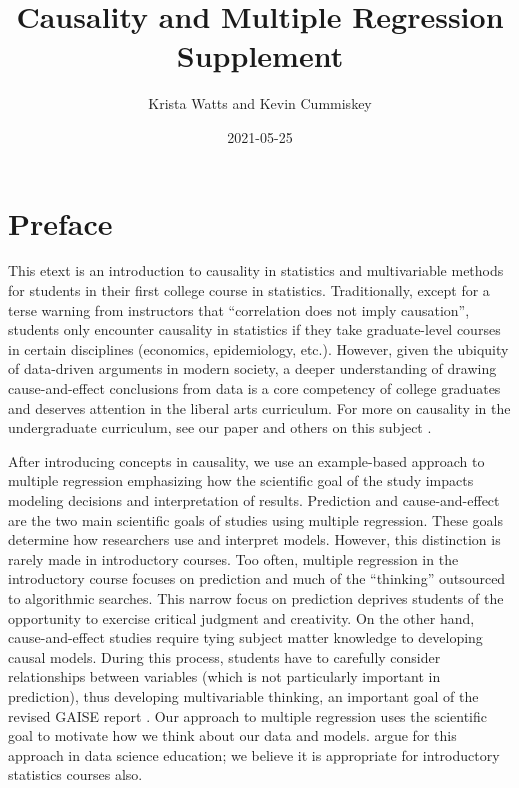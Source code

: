 \documentclass[]{book}
\title{Causality and Multiple Regression Supplement}
\author{Krista Watts and Kevin Cummiskey}
\date{2021-05-25}
\begin{document}
\maketitle

{
\setcounter{tocdepth}{1}
\tableofcontents
}
\hypertarget{preface}{%
\chapter*{Preface}\label{preface}}

This etext is an introduction to causality in statistics and multivariable methods for students in their first college course in statistics. Traditionally, except for a terse warning from instructors that ``correlation does not imply causation'', students only encounter causality in statistics if they take graduate-level courses in certain disciplines (economics, epidemiology, etc.). However, given the ubiquity of data-driven arguments in modern society, a deeper understanding of drawing cause-and-effect conclusions from data is a core competency of college graduates and deserves attention in the liberal arts curriculum. For more on causality in the undergraduate curriculum, see our paper \citep{cummiskey2020causal} and others on this subject \citep{horton2015challenges, kaplan2018teaching, lubke2020we}.

After introducing concepts in causality, we use an example-based approach to multiple regression emphasizing how the scientific goal of the study impacts modeling decisions and interpretation of results. Prediction and cause-and-effect are the two main scientific goals of studies using multiple regression. These goals determine how researchers use and interpret models. However, this distinction is rarely made in introductory courses. Too often, multiple regression in the introductory course focuses on prediction and much of the ``thinking'' outsourced to algorithmic searches. This narrow focus on prediction deprives students of the opportunity to exercise critical judgment and creativity. On the other hand, cause-and-effect studies require tying subject matter knowledge to developing causal models. During this process, students have to carefully consider relationships between variables (which is not particularly important in prediction), thus developing multivariable thinking, an important goal of the revised GAISE report \citep{carver2016guidelines}. Our approach to multiple regression uses the scientific goal to motivate how we think about our data and models. \citet{hernan2019second} argue for this approach in data science education; we believe it is appropriate for introductory statistics courses also.
\end{document}
